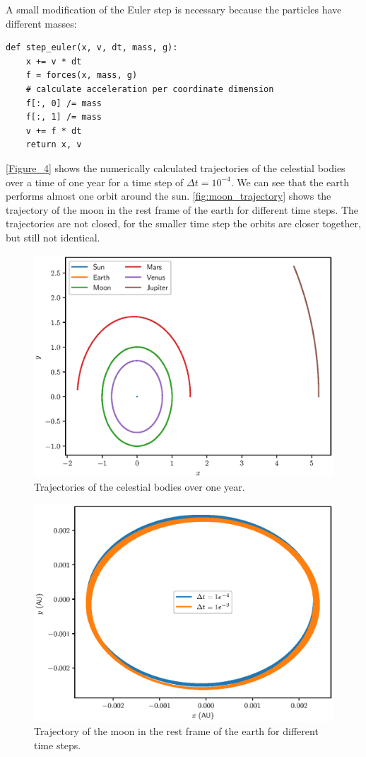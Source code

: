 \documentclass[a4paper,10pt,bibtotoc]{scrartcl}
\begin{document}
A small modification of the Euler step is necessary because the particles have different masses:
\begin{lstlisting}
def step_euler(x, v, dt, mass, g):
    x += v * dt
    f = forces(x, mass, g)
    # calculate acceleration per coordinate dimension
    f[:, 0] /= mass
    f[:, 1] /= mass
    v += f * dt
    return x, v
\end{lstlisting}
\autoref{Figure_4} shows the numerically calculated trajectories of the celestial bodies over a time of one year for a time step of $\Delta t = 10^{-4}$. 
We can see that the earth performs almost one orbit around the sun.
\autoref{fig:moon_trajectory} shows the trajectory of the moon in the rest frame of the earth for different time steps. 
The trajectories are not closed, for the smaller time step the orbits are closer together, but still not identical.



\begin{figure}[t]
 \includegraphics{Figure_4.eps}
 \caption{Trajectories of the celestial bodies over one year.}
 \label{fig:fig4}
\end{figure}

\begin{figure}[h]
\centering
 \includegraphics[width=\textwidth]{moon_trajectory.eps}
 \caption{Trajectory of the moon in the rest frame of the earth for different time steps.}
 \label{fig:moon_trajectory}
\end{figure}
\end{document}
